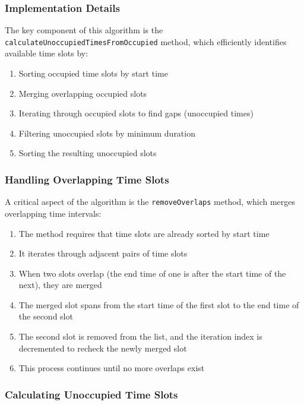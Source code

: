 \subsubsection{Implementation Details}

The key component of this algorithm is the \texttt{calculateUnoccupiedTimesFromOccupied} method, which efficiently identifies available time slots by:

\begin{enumerate}
    \item Sorting occupied time slots by start time
    \item Merging overlapping occupied slots
    \item Iterating through occupied slots to find gaps (unoccupied times)
    \item Filtering unoccupied slots by minimum duration
    \item Sorting the resulting unoccupied slots
\end{enumerate}

\subsubsection{Handling Overlapping Time Slots}

A critical aspect of the algorithm is the \texttt{removeOverlaps} method, which merges overlapping time intervals:

\begin{enumerate}
    \item The method requires that time slots are already sorted by start time
    \item It iterates through adjacent pairs of time slots
    \item When two slots overlap (the end time of one is after the start time of the next), they are merged
    \item The merged slot spans from the start time of the first slot to the end time of the second slot
    \item The second slot is removed from the list, and the iteration index is decremented to recheck the newly merged slot
    \item This process continues until no more overlaps exist
\end{enumerate}

\subsubsection{Calculating Unoccupied Time Slots}

